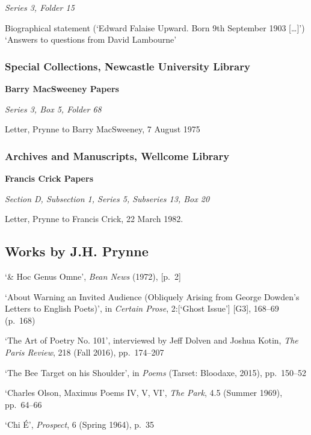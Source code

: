 \documentclass[]{article}
\begin{document}
\emph{Series 3, Folder 15}

Biographical statement (`Edward Falaise Upward. Born 9th September 1903
{[}\ldots{}{]}')\\
`Answers to questions from David Lambourne'

\subsubsection{Special Collections, Newcastle University
Library}\label{special-collections-newcastle-university-library}

\textbf{Barry MacSweeney Papers}

\emph{Series 3, Box 5, Folder 68}

Letter, Prynne to Barry MacSweeney, 7 August 1975

\subsubsection{Archives and Manuscripts, Wellcome
Library}\label{archives-and-manuscripts-wellcome-library}

\textbf{Francis Crick Papers}

\emph{Section D, Subsection 1, Series 5, Subseries 13, Box 20}

Letter, Prynne to Francis Crick, 22 March 1982.

\subsection{Works by J.H. Prynne}\label{works-by-j.h.-prynne}

\setlength{\parindent}{-16pt} \setlength{\leftskip}{16pt}
\setlength{\parskip}{0pt} `\& Hoc Genus Omne', \emph{Bean News} (1972),
{[}p.~2{]}

`About Warning an Invited Audience (Obliquely Arising from George
Dowden's Letters to English Poets)', in \emph{Certain Prose},
2:{[}`Ghost Issue'{]} {[}G3{]}, 168--69 (p.~168)

`The Art of Poetry No. 101', interviewed by Jeff Dolven and Joshua
Kotin, \emph{The Paris Review}, 218 (Fall 2016), pp.~174--207

`The Bee Target on his Shoulder', in \emph{Poems} (Tarset: Bloodaxe,
2015), pp.~150--52

`Charles Olson, Maximus Poems IV, V, VI', \emph{The Park}, 4.5 (Summer
1969), pp.~64--66

`Chi É', \emph{Prospect}, 6 (Spring 1964), p.~35
\end{document}
